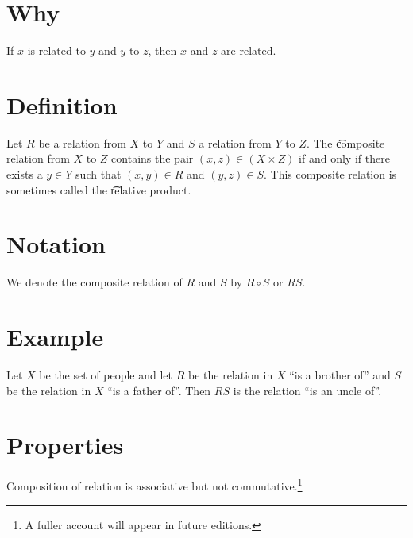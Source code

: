 
\section*{Why}

If $x$ is related to $y$ and $y$ to $z$, then $x$ and $z$ are related.

\section*{Definition}

Let $R$ be a relation from $X$ to $Y$ and $S$ a relation from $Y$ to $Z$.
The \t{composite relation} from $X$ to $Z$ contains the pair $(x, z) \in (X \times  Z)$ if and only if there exists a $y \in Y$ such that $(x, y) \in R$ and $(y,z) \in S$.
This composite relation is sometimes called the \t{relative product}.

\section*{Notation}

We denote the composite relation of $R$ and $S$ by $R \circ S$ or $RS$.

\section*{Example}

Let $X$ be the set of people and let $R$ be the relation in $X$ ``is a brother of'' and $S$ be the relation in $X$ ``is a father of''.
Then $RS$ is the relation ``is an uncle of''.

\section*{Properties}

Composition of relation is associative but not commutative.\footnote{A fuller account will appear in future editions.}


\blankpage